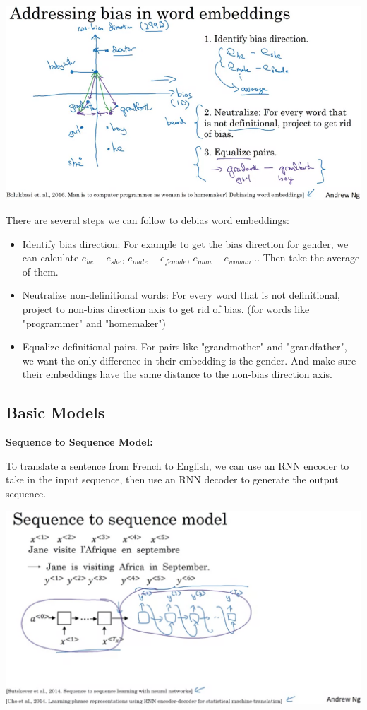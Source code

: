 \documentclass{article}
\begin{document}
\begin{center}
\includegraphics[scale=0.3]{./images/word_embeddings_bias.png}
\end{center}

\noindent There are several steps we can follow to debias word embeddings:

\begin{itemize}
    \item Identify bias direction: For example to get the bias direction for gender, we can calculate \(e_{he} - e_{she}\),  \(e_{male} - e_{female}\),  \(e_{man} - e_{woman}\)... Then take the average of them.
    \item Neutralize non-definitional words: For every word that is not definitional, project to non-bias direction axis to get rid of bias. (for words like "programmer" and "homemaker")
    \item Equalize definitional pairs. For pairs like "grandmother" and "grandfather", we want the only difference in their embedding is the gender. And make sure their embeddings have the same distance to the non-bias direction axis.
\end{itemize}

\subsection{Basic Models}

\noindent \textbf{Sequence to Sequence Model:}

\noindent To translate a sentence from French to English, we can use an RNN encoder to take in the input sequence, then use an RNN decoder to generate the output sequence.

\begin{center}
\includegraphics[scale=0.3]{./images/sequence_to_sequence_model.png}
\end{center}
\end{document}
